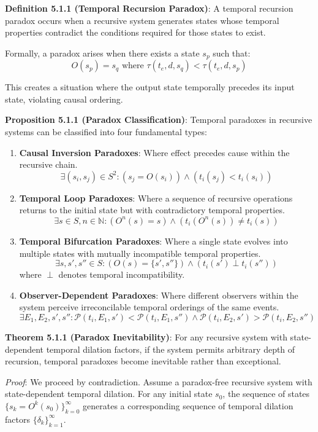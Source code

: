 \documentclass[
]{article}
\begin{document}
\textbf{Definition 5.1.1 (Temporal Recursion Paradox)}: A temporal
recursion paradox occurs when a recursive system generates states whose
temporal properties contradict the conditions required for those states
to exist.

Formally, a paradox arises when there exists a state \(s_p\) such that:
\[O(s_p) = s_q \text{ where } \tau(t_e, d, s_q) < \tau(t_e, d, s_p)\]

This creates a situation where the output state temporally precedes its
input state, violating causal ordering.

\textbf{Proposition 5.1.1 (Paradox Classification)}: Temporal paradoxes
in recursive systems can be classified into four fundamental types:

\begin{enumerate}
\def\labelenumi{\arabic{enumi}.}
\item
  \textbf{Causal Inversion Paradoxes}: Where effect precedes cause
  within the recursive chain.
  \[\exists (s_i, s_j) \in S^2 : (s_j = O(s_i)) \land (t_i(s_j) < t_i(s_i))\]
\item
  \textbf{Temporal Loop Paradoxes}: Where a sequence of recursive
  operations returns to the initial state but with contradictory
  temporal properties.
  \[\exists s \in S, n \in \mathbb{N} : (O^n(s) = s) \land (t_i(O^n(s)) \neq t_i(s))\]
\item
  \textbf{Temporal Bifurcation Paradoxes}: Where a single state evolves
  into multiple states with mutually incompatible temporal properties.
  \[\exists s, s', s'' \in S : (O(s) = \{s', s''\}) \land (t_i(s') \perp t_i(s''))\]
  where \(\perp\) denotes temporal incompatibility.
\item
  \textbf{Observer-Dependent Paradoxes}: Where different observers
  within the system perceive irreconcilable temporal orderings of the
  same events.
  \[\exists E_1, E_2, s', s'' : \mathcal{P}(t_i, E_1, s') < \mathcal{P}(t_i, E_1, s'') \land \mathcal{P}(t_i, E_2, s') > \mathcal{P}(t_i, E_2, s'')\]
\end{enumerate}

\textbf{Theorem 5.1.1 (Paradox Inevitability)}: For any recursive system
with state-dependent temporal dilation factors, if the system permits
arbitrary depth of recursion, temporal paradoxes become inevitable
rather than exceptional.

\emph{Proof}: We proceed by contradiction. Assume a paradox-free
recursive system with state-dependent temporal dilation. For any initial
state \(s_0\), the sequence of states
\(\{s_k = O^k(s_0)\}_{k=0}^{\infty}\) generates a corresponding sequence
of temporal dilation factors \(\{\delta_k\}_{k=1}^{\infty}\).
\end{document}
